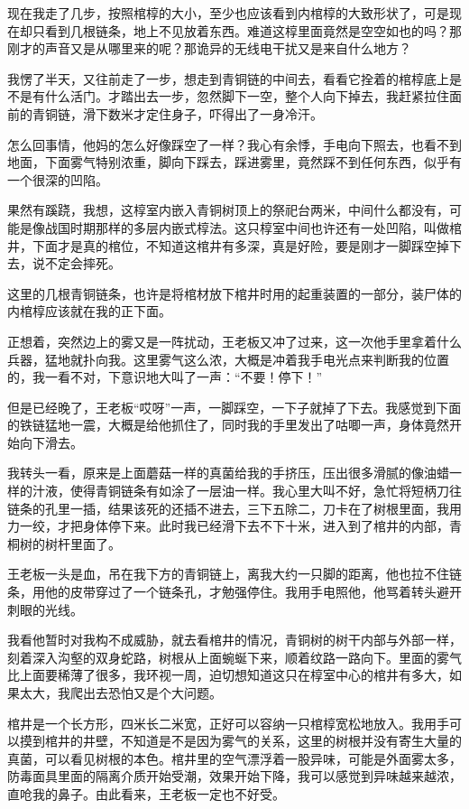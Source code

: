 现在我走了几步，按照棺椁的大小，至少也应该看到内棺椁的大致形状了，可是现在却只看到几根链条，地上不见放着东西。难道这椁里面竟然是空空如也的吗？那刚才的声音又是从哪里来的呢？那诡异的无线电干扰又是来自什么地方？

我愣了半天，又往前走了一步，想走到青铜链的中间去，看看它拴着的棺椁底上是不是有什么活门。才踏出去一步，忽然脚下一空，整个人向下掉去，我赶紧拉住面前的青铜链，滑下数米才定住身子，吓得出了一身冷汗。

怎么回事情，他妈的怎么好像踩空了一样？我心有余悸，手电向下照去，也看不到地面，下面雾气特别浓重，脚向下踩去，踩进雾里，竟然踩不到任何东西，似乎有一个很深的凹陷。

果然有蹊跷，我想，这椁室内嵌入青铜树顶上的祭祀台两米，中间什么都没有，可能是像战国时期那样的多层内嵌式椁法。这只椁室中间也许还有一处凹陷，叫做棺井，下面才是真的棺位，不知道这棺井有多深，真是好险，要是刚才一脚踩空掉下去，说不定会摔死。

这里的几根青铜链条，也许是将棺材放下棺井时用的起重装置的一部分，装尸体的内棺椁应该就在我的正下面。

正想着，突然边上的雾又是一阵扰动，王老板又冲了过来，这一次他手里拿着什么兵器，猛地就扑向我。这里雾气这么浓，大概是冲着我手电光点来判断我的位置的，我一看不对，下意识地大叫了一声：“不要！停下！”

但是已经晚了，王老板“哎呀”一声，一脚踩空，一下子就掉了下去。我感觉到下面的铁链猛地一震，大概是给他抓住了，同时我的手里发出了咕唧一声，身体竟然开始向下滑去。

我转头一看，原来是上面蘑菇一样的真菌给我的手挤压，压出很多滑腻的像油蜡一样的汁液，使得青铜链条有如涂了一层油一样。我心里大叫不好，急忙将短柄刀往链条的孔里一插，结果该死的还插不进去，三下五除二，刀卡在了树根里面，我用力一绞，才把身体停下来。此时我已经滑下去不下十米，进入到了棺井的内部，青桐树的树杆里面了。

王老板一头是血，吊在我下方的青铜链上，离我大约一只脚的距离，他也拉不住链条，用他的皮带穿过了一个链条孔，才勉强停住。我用手电照他，他骂着转头避开刺眼的光线。

我看他暂时对我构不成威胁，就去看棺井的情况，青铜树的树干内部与外部一样，刻着深入沟壑的双身蛇路，树根从上面蜿蜒下来，顺着纹路一路向下。里面的雾气比上面要稀薄了很多，我环视一周，迫切想知道这只在椁室中心的棺井有多大，如果太大，我爬出去恐怕又是个大问题。

棺井是一个长方形，四米长二米宽，正好可以容纳一只棺椁宽松地放入。我用手可以摸到棺井的井壁，不知道是不是因为雾气的关系，这里的树根并没有寄生大量的真菌，可以看见树根的本色。棺井里的空气漂浮着一股异味，可能是外面雾太多，防毒面具里面的隔离介质开始受潮，效果开始下降，我可以感觉到异味越来越浓，直呛我的鼻子。由此看来，王老板一定也不好受。

